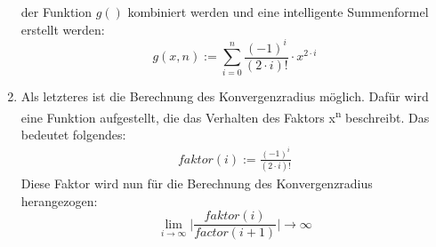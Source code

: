 \documentclass[a4paper,10pt]{article}
\begin{document}
\begin{enumerate}
{    der Funktion $ g() $ kombiniert werden und eine intelligente
    Summenformel erstellt werden:
    \begin{equation}
      \label{eq:11}
      g(x, n) := \sum_{i = 0}^{n} \frac{(-1)^i}{(2 \cdot i)!} \cdot x^{2 \cdot i}
    \end{equation}
  }
\item { Als letzteres ist die Berechnung des Konvergenzradius
    möglich. Dafür wird eine Funktion aufgestellt, die das Verhalten
    des Faktors x\textsuperscript{n} beschreibt. Das bedeutet
    folgendes:
    \begin{equation}
      \label{eq:15}
      \begin{split}
        faktor(i) := \frac{(-1)^i}{(2 \cdot i)!}
      \end{split}
    \end{equation}
    Diese Faktor wird nun für die Berechnung des Konvergenzradius
    herangezogen:
    \begin{equation}
      \label{eq:16}
      \lim_{i\to\infty} \lvert \frac{faktor(i)}{factor(i + 1)} \rvert \rightarrow \infty
    \end{equation}
  }
\end{enumerate}
\end{document}
